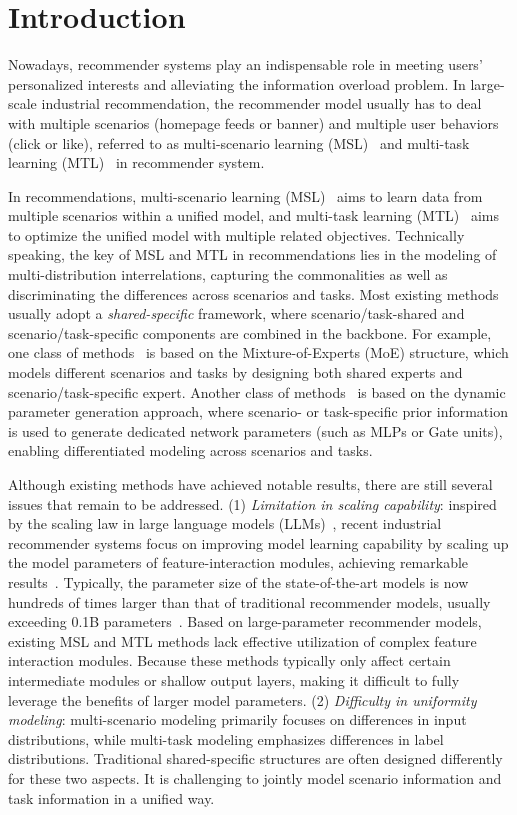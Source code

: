 \section{Introduction}
\label{sec-intro}
Nowadays, recommender systems play an indispensable role in meeting users’ personalized interests and alleviating the information overload problem.
In large-scale industrial recommendation, the recommender model usually has to deal with multiple scenarios (\eg homepage feeds or banner) and multiple user behaviors (\eg click or like), referred to as multi-scenario learning (MSL)~\cite{msl-benchmark} and multi-task learning (MTL)~\cite{mtl-survey} in recommender system.

In recommendations, multi-scenario learning (MSL)~\cite{PLE,HMoE,STAR,PEPNet,hinet,mmfi,m3oe,ADL} aims to learn data from multiple scenarios within a unified model, and multi-task learning (MTL)~\cite{sharedbottom,MMoE,Cross-Stitch,snr,adatt} aims to optimize the unified model with multiple related objectives.
Technically speaking, the key of MSL and MTL in recommendations lies in the modeling of multi-distribution interrelations, capturing the commonalities as well as discriminating the differences across scenarios and tasks.
Most existing methods usually adopt a \emph{shared-specific} framework, where scenario/task-shared and scenario/task-specific components are combined in the backbone.
For example, one class of methods~\cite{MMoE,HMoE,PLE} is based on the Mixture-of-Experts (MoE) structure, which models different scenarios and tasks by designing both shared experts and scenario/task-specific expert.
Another class of methods~\cite{STAR,PEPNet} is based on the dynamic parameter generation approach, where scenario- or task-specific prior information is used to generate dedicated network parameters (such as MLPs or Gate units), enabling differentiated modeling across scenarios and tasks.

Although existing methods have achieved notable results, there are still several issues that remain to be addressed.
(1) \emph{Limitation in scaling capability}: inspired by the scaling law in large language models (LLMs)~\cite{LLM1,LLM2}, recent industrial recommender systems focus on improving model learning capability by scaling up the model parameters of feature-interaction modules, achieving remarkable results~\cite{RankMixer,KGBRank,OneTrans,wukong,HSTU,MTGR,hyformer}.
Typically, the parameter size of the state-of-the-art models is now hundreds of times larger than that of traditional recommender models, usually exceeding 0.1B parameters~\cite{RankMixer,KGBRank}.
Based on large-parameter recommender models, existing MSL and MTL methods lack effective utilization of complex feature interaction modules.
Because these methods typically only affect certain intermediate modules or shallow output layers, making it difficult to fully leverage the benefits of larger model parameters.
(2) \emph{Difficulty in uniformity modeling}: multi-scenario modeling primarily focuses on differences in input distributions, while multi-task modeling emphasizes differences in label distributions.
Traditional shared-specific structures are often designed differently for these two aspects.
It is challenging to jointly model scenario information and task information in a unified way.

